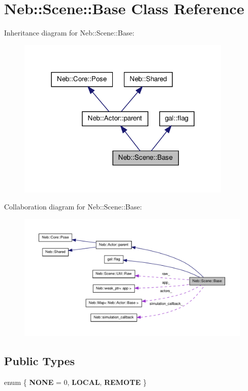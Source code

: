 \hypertarget{classNeb_1_1Scene_1_1Base}{\section{\-Neb\-:\-:\-Scene\-:\-:\-Base \-Class \-Reference}
\label{classNeb_1_1Scene_1_1Base}
}


\-Inheritance diagram for \-Neb\-:\-:\-Scene\-:\-:\-Base\-:\nopagebreak
\begin{figure}[H]
\begin{center}
\leavevmode
\includegraphics[width=290pt]{classNeb_1_1Scene_1_1Base__inherit__graph}
\end{center}
\end{figure}


\-Collaboration diagram for \-Neb\-:\-:\-Scene\-:\-:\-Base\-:\nopagebreak
\begin{figure}[H]
\begin{center}
\leavevmode
\includegraphics[width=350pt]{classNeb_1_1Scene_1_1Base__coll__graph}
\end{center}
\end{figure}
\subsection*{\-Public \-Types}
\begin{DoxyCompactItemize}
\item 
enum \{ {\bfseries \-N\-O\-N\-E} =  0, 
{\bfseries \-L\-O\-C\-A\-L}, 
{\bfseries \-R\-E\-M\-O\-T\-E}
 \}
\end{DoxyCompactItemize}
